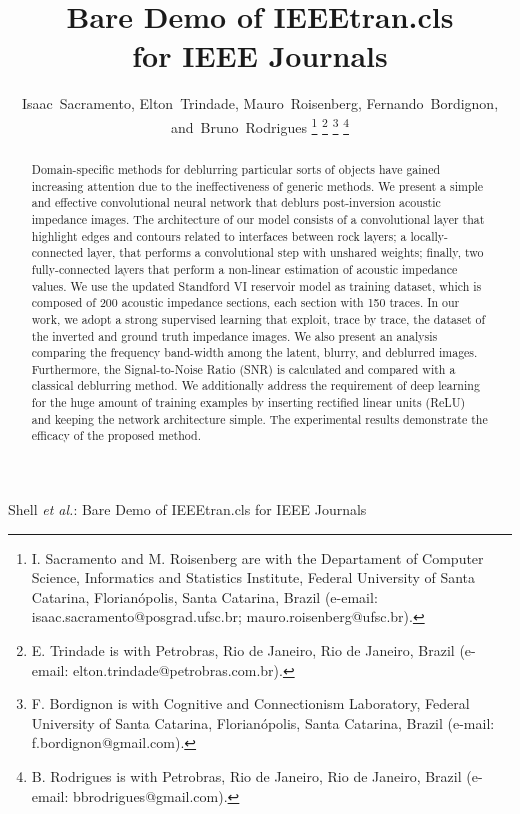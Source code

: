\documentclass[journal]{IEEEtran}
\begin{document}
\title{Bare Demo of IEEEtran.cls\\ for IEEE Journals}


\author{Isaac~Sacramento,
        Elton~Trindade,
        Mauro~Roisenberg,
        Fernando~Bordignon,
        and~Bruno~Rodrigues
\thanks{I. Sacramento and M. Roisenberg are with the Departament of Computer Science, Informatics and Statistics Institute,
Federal University of Santa Catarina, Florianópolis, Santa Catarina, Brazil (e-email: isaac.sacramento@posgrad.ufsc.br;
mauro.roisenberg@ufsc.br).}%
\thanks{E. Trindade is with Petrobras, Rio de Janeiro, Rio de Janeiro, Brazil (e-email: elton.trindade@petrobras.com.br).}%
\thanks{F. Bordignon is with Cognitive and Connectionism Laboratory, Federal University of Santa Catarina, Florianópolis,
Santa Catarina, Brazil (e-mail: f.bordignon@gmail.com).}
\thanks{B. Rodrigues is with Petrobras, Rio de Janeiro, Rio de Janeiro, Brazil (e-email: bbrodrigues@gmail.com).}}

%
{Shell \MakeLowercase{\textit{et al.}}: Bare Demo of IEEEtran.cls for IEEE Journals}

\maketitle

\begin{abstract}
Domain-specific methods for deblurring particular sorts of
objects have gained increasing attention due to the ineffectiveness
of generic methods.
We present a simple and effective convolutional
neural network that deblurs post-inversion acoustic impedance images. 
The architecture of our model consists of a convolutional layer
that highlight edges and contours related to
interfaces between rock layers; a locally-connected
layer, that performs a convolutional step with unshared weights;
finally, two fully-connected layers that
perform a non-linear estimation of acoustic impedance values.
We use the updated Standford VI reservoir model as training dataset,
which is composed of 200 acoustic impedance sections, each section with
150 traces. In our work, we adopt a strong supervised learning
that exploit, trace by trace, the dataset of the inverted and ground truth impedance images.
We also present an analysis comparing the frequency band-width among 
the latent, blurry, and deblurred images. Furthermore, the Signal-to-Noise Ratio (SNR)
is calculated and compared with a classical deblurring method.
We additionally address the requirement of deep learning for the huge amount
of training examples by inserting rectified linear units (ReLU) and keeping
the network architecture simple. 
The experimental results demonstrate the efficacy of the proposed method.
\end{abstract}
\end{document}
